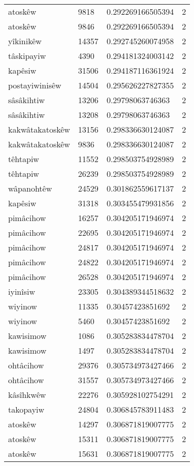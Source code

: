 \begin{longtable}{llll}
atoskêw & 9818 & 0.292269166505394 & 2 \\
atoskêw & 9846 & 0.292269166505394 & 2 \\
yîkinikêw & 14357 & 0.292745260074958 & 2 \\
tâskipayiw & 4390 & 0.294181324003142 & 2 \\
kapêsiw & 31506 & 0.294187116361924 & 2 \\
postayiwinisêw & 14504 & 0.295626227827355 & 2 \\
sâsâkihtiw & 13206 & 0.29798063746363 & 2 \\
sâsâkihtiw & 13208 & 0.29798063746363 & 2 \\
kakwâtakatoskêw & 13156 & 0.298336630124087 & 2 \\
kakwâtakatoskêw & 9836 & 0.298336630124087 & 2 \\
têhtapiw & 11552 & 0.298503754928989 & 2 \\
têhtapiw & 26239 & 0.298503754928989 & 2 \\
wâpanohtêw & 24529 & 0.301862559617137 & 2 \\
kapêsiw & 31318 & 0.303455479931856 & 2 \\
pimâcihow & 16257 & 0.304205171946974 & 2 \\
pimâcihow & 22695 & 0.304205171946974 & 2 \\
pimâcihow & 24817 & 0.304205171946974 & 2 \\
pimâcihow & 24822 & 0.304205171946974 & 2 \\
pimâcihow & 26528 & 0.304205171946974 & 2 \\
iyinîsiw & 23305 & 0.304389344518632 & 2 \\
wiyinow & 11335 & 0.30457423851692 & 2 \\
wiyinow & 5460 & 0.30457423851692 & 2 \\
kawisimow & 1086 & 0.305283834478704 & 2 \\
kawisimow & 1497 & 0.305283834478704 & 2 \\
ohtâcihow & 29376 & 0.305734973427466 & 2 \\
ohtâcihow & 31557 & 0.305734973427466 & 2 \\
kâsîhkwêw & 22276 & 0.305928102754291 & 2 \\
takopayiw & 24804 & 0.306845783911483 & 2 \\
atoskêw & 14297 & 0.306871819007775 & 2 \\
atoskêw & 15311 & 0.306871819007775 & 2 \\
atoskêw & 15631 & 0.306871819007775 & 2 \\

\end{longtable}
